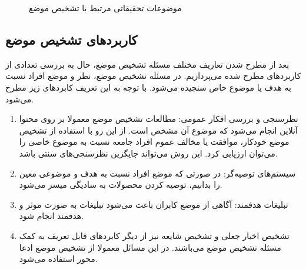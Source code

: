 \begin{figure}[H]
	\caption[موضوعات تحقیقاتی مرتبط با تشخیص موضع]{
		موضوعات تحقیقاتی مرتبط با تشخیص موضع
		 \cite{10.1145/3369026}\label{stance_related_research}}
	
\end{figure}

\subsection{کاربردهای تشخیص موضع}
بعد از مطرح شدن تعاریف مختلف مسئله تشخیص موضع، حال به بررسی تعدادی از کاربردهای مطرح شده می‌پردازیم. در مسئله تشخیص موضع، نظر و موضع افراد نسبت به هدف یا موضوع خاص سنجیده می‌شود. با توجه به این تعریف کابردهای زیر مطرح می‌شود.
\begin{enumerate}
	\item 
	 نظرسنجی و بررسی افکار عمومی: مطالعات تشخیص موضع معمولا بر روی محتوا آنلاین انجام می‌شود که موضوع آن مشخص است. از این رو با استفاده از تشخیص موضع خودکار، موافقت یا مخالف عموم افراد جامعه نسبت به موضوع خاصی را می‌توان ارزیابی کرد. این روش می‌تواند جایگزین نظرسنجی‌های سنتی باشد.
	 
	 \item 
	  سیستم‌های توصیە‌گر: در صورتی که موضع افراد نسبت به هدف و موضوعی معین را بدانیم، توصیه کردن محصولات به سادیگی میسر می‌شود.
	 \item 
	 
	 تبلیغات هدفمند: آگاهی از موضع کابران باعث می‌شود تبلیغات به صورت موثر و هدفمند انجام شود.

	 \item
	 
	 تشخیص اخبار جعلی 
	 \cite{popat-etal-2018-declare}
	 و تشخیص شایعه نیز از دیگر کابردهای قابل تعریف به کمک مسئله تشخیص موضع می‌باشند. در این مسائل معمولا از تشخیص موضع ادعا محور استفاده می‌شود.
	 				
\end{enumerate}


